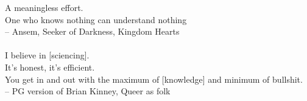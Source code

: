 \begin{myepigraph}
A meaningless effort. \\ One who knows nothing can understand nothing \\ -- Ansem, Seeker of Darkness, Kingdom Hearts \\\\[1.5ex]%
I believe in [sciencing].\\ It's honest, it's efficient. \\ You get in and out with the maximum of [knowledge] and minimum of bullshit. \\ -- PG version of Brian Kinney, Queer as folk
\end{myepigraph}
